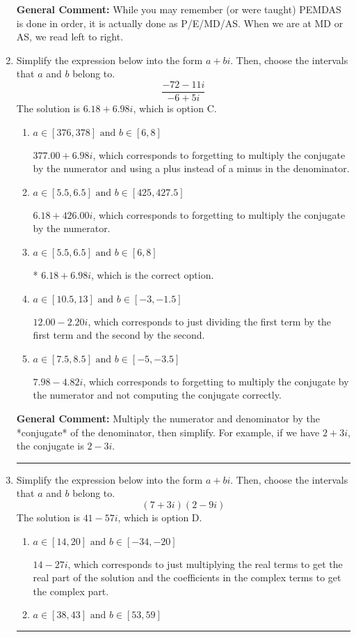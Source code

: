 \documentclass{extbook}[14pt]
\newcommand{\litem}[1]{\item #1

\rule{\textwidth}{0.4pt}}
\begin{document}
\begin{enumerate}
{\textbf{General Comment:} While you may remember (or were taught) PEMDAS is done in order, it is actually done as P/E/MD/AS. When we are at MD or AS, we read left to right.
}
\litem{
Simplify the expression below into the form $a+bi$. Then, choose the intervals that $a$ and $b$ belong to.
\[ \frac{-72 - 11 i}{-6 + 5 i} \]The solution is \( 6.18  + 6.98 i \), which is option C.\begin{enumerate}[label=\Alph*.]
\item \( a \in [376, 378] \text{ and } b \in [6, 8] \)

 $377.00  + 6.98 i$, which corresponds to forgetting to multiply the conjugate by the numerator and using a plus instead of a minus in the denominator.
\item \( a \in [5.5, 6.5] \text{ and } b \in [425, 427.5] \)

 $6.18  + 426.00 i$, which corresponds to forgetting to multiply the conjugate by the numerator.
\item \( a \in [5.5, 6.5] \text{ and } b \in [6, 8] \)

* $6.18  + 6.98 i$, which is the correct option.
\item \( a \in [10.5, 13] \text{ and } b \in [-3, -1.5] \)

 $12.00  - 2.20 i$, which corresponds to just dividing the first term by the first term and the second by the second.
\item \( a \in [7.5, 8.5] \text{ and } b \in [-5, -3.5] \)

 $7.98  - 4.82 i$, which corresponds to forgetting to multiply the conjugate by the numerator and not computing the conjugate correctly.
\end{enumerate}

\textbf{General Comment:} Multiply the numerator and denominator by the *conjugate* of the denominator, then simplify. For example, if we have $2+3i$, the conjugate is $2-3i$.
}
\litem{
Simplify the expression below into the form $a+bi$. Then, choose the intervals that $a$ and $b$ belong to.
\[ (7 + 3 i)(2 - 9 i) \]The solution is \( 41 - 57 i \), which is option D.\begin{enumerate}[label=\Alph*.]
\item \( a \in [14, 20] \text{ and } b \in [-34, -20] \)

 $14 - 27 i$, which corresponds to just multiplying the real terms to get the real part of the solution and the coefficients in the complex terms to get the complex part.
\item \( a \in [38, 43] \text{ and } b \in [53, 59] \)


\end{enumerate}}
\end{enumerate}
\end{document}
